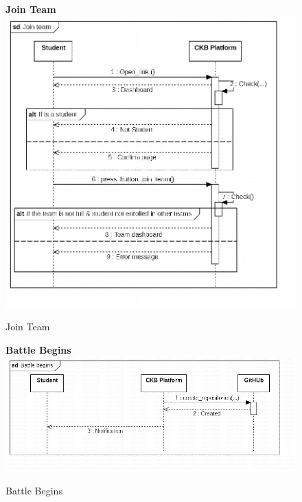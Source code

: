 \begin{enumerate}[label=\textbf{[UC\arabic*]}]
\begin{enumerate}[label=\textbf{[UC\arabic*]}]
    \begin{figure}
    \item \textbf{Join Team}
        \centering
        \includegraphics[width= \textwidth]{Images/Join team.jpg}
        \caption{Join Team}
        \label{fig:enter-label}
    \end{figure}
    
    \begin{figure}
    \item \textbf{Battle Begins}
        \centering
        \includegraphics[width= \textwidth]{Images/Battle begins.jpg}
        \caption{Battle Begins}
        \label{fig:enter-label}
    \end{figure}
    

\end{enumerate}
\end{enumerate}
